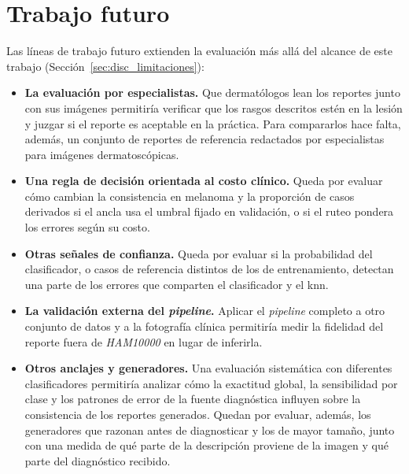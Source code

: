 \section{Trabajo futuro}
\label{sec:concl_futuro}

Las líneas de trabajo futuro extienden la evaluación más allá del alcance de este trabajo
(Sección~\ref{sec:disc_limitaciones}):
\begin{itemize}
    \item \textbf{La evaluación por especialistas.} Que dermatólogos lean los reportes junto con sus imágenes
    permitiría verificar que los rasgos descritos estén en la lesión y juzgar si el reporte es aceptable en la
    práctica. Para compararlos hace falta, además, un conjunto de reportes de referencia redactados por especialistas
    para imágenes dermatoscópicas.
    \item \textbf{Una regla de decisión orientada al costo clínico.} Queda por evaluar cómo cambian la consistencia en
    melanoma y la proporción de casos derivados si el ancla usa el umbral fijado en validación, o si el ruteo pondera
    los errores según su costo.
    \item \textbf{Otras señales de confianza.} Queda por evaluar si la probabilidad del clasificador, o casos de
    referencia distintos de los de entrenamiento, detectan una parte de los errores que comparten el clasificador y el
    \gls{knn}.
    \item \textbf{La validación externa del \emph{pipeline}.} Aplicar el \emph{pipeline} completo a otro conjunto de datos y
    a la fotografía clínica permitiría medir la fidelidad del reporte fuera de \emph{HAM10000} en lugar de inferirla.
    \item \textbf{Otros anclajes y generadores.} Una evaluación sistemática con diferentes clasificadores permitiría analizar cómo la exactitud global, la sensibilidad por clase y los patrones de error de la fuente diagnóstica influyen sobre la consistencia de los reportes generados. Quedan por evaluar, además, los generadores que razonan
    antes de diagnosticar y los de mayor tamaño, junto con una medida de qué parte de la descripción proviene de la
    imagen y qué parte del diagnóstico recibido.
\end{itemize}
